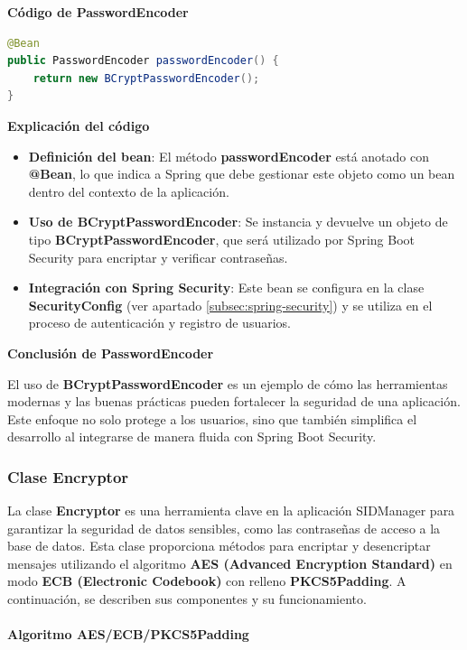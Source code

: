 \documentclass[draft]{scrbook}
\begin{document}
\textbf{Código de PasswordEncoder}

\begin{lstlisting}[language=Java]
@Bean
public PasswordEncoder passwordEncoder() {
    return new BCryptPasswordEncoder();
}
\end{lstlisting}

\textbf{Explicación del código}
\begin{itemize}
    \item \textbf{Definición del bean}: El método \textbf{passwordEncoder} está anotado con \textbf{@Bean}, lo que indica a Spring que debe gestionar este objeto como un bean dentro del contexto de la aplicación.
    \item \textbf{Uso de BCryptPasswordEncoder}: Se instancia y devuelve un objeto de tipo \textbf{BCryptPasswordEncoder}, que será utilizado por Spring Boot Security para encriptar y verificar contraseñas.
    \item \textbf{Integración con Spring Security}: Este bean se configura en la clase \textbf{SecurityConfig} (ver apartado \ref{subsec:spring-security}) y se utiliza en el proceso de autenticación y registro de usuarios.
\end{itemize}


\textbf{Conclusión de PasswordEncoder}

El uso de \textbf{BCryptPasswordEncoder} es un ejemplo de cómo las herramientas modernas y las buenas prácticas pueden fortalecer la seguridad de una aplicación. Este enfoque no solo protege a los usuarios, sino que también simplifica el desarrollo al integrarse de manera fluida con Spring Boot Security.


\subsubsection{Clase Encryptor}
\label{subsec:encryptor}

La clase \textbf{Encryptor} es una herramienta clave en la aplicación SIDManager para garantizar la seguridad de datos sensibles, como las contraseñas de acceso a la base de datos. Esta clase proporciona métodos para encriptar y desencriptar mensajes utilizando el algoritmo \textbf{AES (Advanced Encryption Standard)} en modo \textbf{ECB (Electronic Codebook)} con relleno \textbf{PKCS5Padding}. A continuación, se describen sus componentes y su funcionamiento.

\paragraph{Algoritmo AES/ECB/PKCS5Padding}
\end{document}

